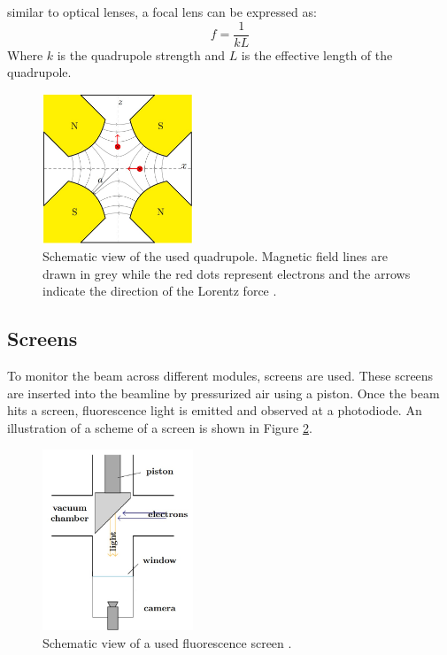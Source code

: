 \documentclass[12pt]{article}
\begin{document}
similar to optical lenses, a focal lens can be expressed as:
\begin{equation}
    f = \frac{1}{kL}
\end{equation}
Where $k$ is the quadrupole strength and $L$ is the effective length of the quadrupole. 



\begin{figure}[H]
    \centering
    \includegraphics[width = 0.4\textwidth]{fig/quadrupole.jpg}
    \caption{Schematic view of the used quadrupole. Magnetic field lines are drawn in grey while the red dots represent electrons and the arrows indicate the direction of the Lorentz force \cite{lecturenote}.}
    \label{quadrupole}
\end{figure}

\subsection*{Screens}
To monitor the beam across different modules, screens are used. These screens are inserted into the beamline by pressurized air using a piston. Once the beam hits a screen, fluorescence light is emitted and observed at a photodiode. An illustration of a scheme of a screen is shown in Figure \ref{screen}. 

\begin{figure}[H]
    \centering
    \includegraphics[width = 0.4\textwidth]{fig/screen.jpg}
    \caption{Schematic view of a used fluorescence screen \cite{lecturenote}.}
    \label{screen}
\end{figure}
\end{document}
